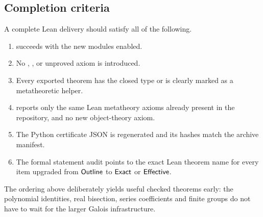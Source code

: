 \subsection{Completion criteria}

A complete Lean delivery should satisfy all of the following.

\begin{enumerate}
\item {} succeeds with the new modules enabled.
\item No , , or unproved axiom is introduced.
\item Every exported theorem has the closed  type or is clearly
      marked as a metatheoretic helper.
\item {} reports only the same Lean metatheory axioms
      already present in the repository, and no new object-theory axiom.
\item The Python certificate JSON is regenerated and its hashes match the
      archive manifest.
\item The formal statement audit points to the exact Lean theorem name for
      every item upgraded from \(\textsf{Outline}\) to \(\textsf{Exact}\) or
      \(\textsf{Effective}\).
\end{enumerate}

The ordering above deliberately yields useful checked theorems early: the
polynomial identities, real bisection, series coefficients and finite groups do
not have to wait for the larger Galois infrastructure.
